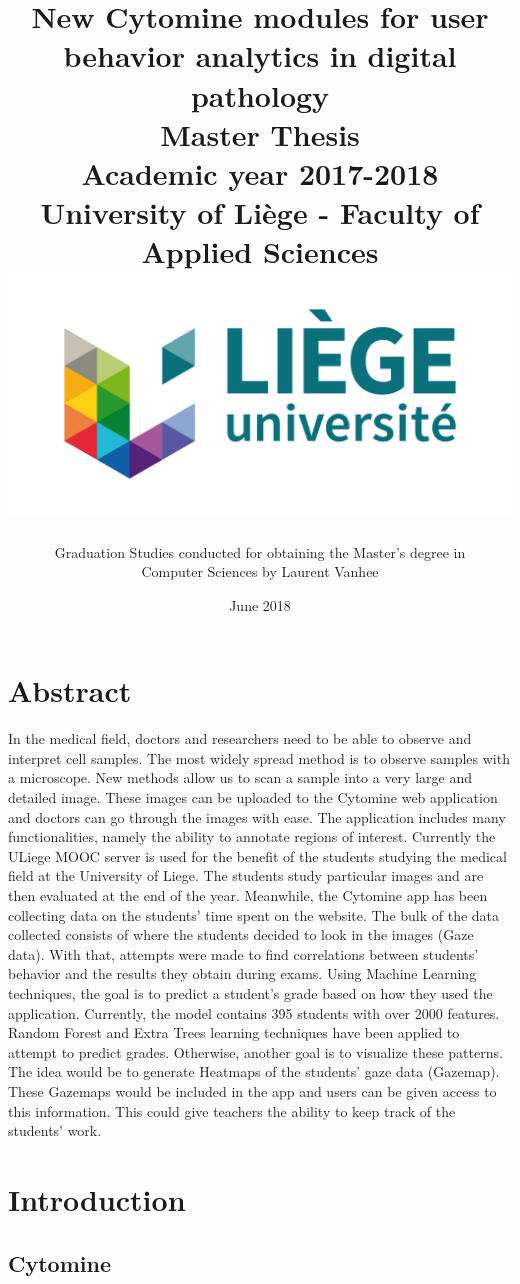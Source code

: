 \documentclass[a4paper,11pt]{report}
\title{
\LARGE
\textbf{New Cytomine modules for user behavior analytics in digital pathology}\\
\vspace{1cm}
Master Thesis\\
\vspace{0.3cm}
Academic year 2017-2018\\
University of Li\`{e}ge - Faculty of Applied Sciences\\
\vspace{3cm}
\includegraphics[scale=0.75]{logo.jpg}
\vspace{2cm}
}
\author{ Graduation Studies conducted for obtaining the Master's degree in \\Computer Sciences by Laurent Vanhee}
\date{June 2018}
\numberwithin{figure}{section} %
\begin{document}
\pagestyle{empty}
\maketitle

\tableofcontents

\pagestyle{fancy}
\fancyhf{}
\newpage
\section{Abstract}
In the medical field, doctors and researchers need to be able to observe and interpret cell samples.
The
most widely spread method is to observe samples with a microscope.
New methods allow us to scan a
sample into a very large and detailed image.
These images can be uploaded to the Cytomine web
application and doctors can go through the images with ease.
The application includes many
functionalities, namely the ability to annotate regions of interest.
Currently the ULiege MOOC server is
used for the benefit of the students studying the medical field at the University of Liege.
The students
study particular images and are then evaluated at the end of the year.
Meanwhile, the Cytomine app
has been collecting data on the students’ time spent on the website.
The bulk of the data collected
consists of where the students decided to look in the images (Gaze data).
With that, attempts  were made to find correlations between students’ behavior and the results they obtain during exams.
Using Machine
Learning techniques, the goal is to predict a student’s grade based on how they used the application.
Currently, the model contains 395 students with over 2000 features.
Random Forest and Extra Trees
learning techniques have been applied to attempt to predict grades.
Otherwise, another goal is to
visualize these patterns.
The idea would be to generate Heatmaps of the students’ gaze data (Gazemap).
These Gazemaps would be included in the app and users can be given access to this information.
This
could give teachers the ability to keep track of the students’ work.
\section{Introduction}

\subsection{Cytomine}
\end{document}
